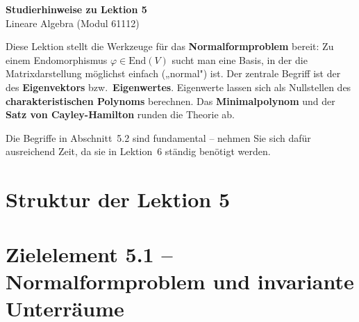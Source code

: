 \documentclass[a4paper,12pt]{article}
\begin{document}
\begin{center}
  {\LARGE\bfseries Studierhinweise zu Lektion 5}\\[0.5em]
  {\large Lineare Algebra (Modul 61112)}
\end{center}

\vspace{0.8em}

Diese Lektion stellt die Werkzeuge für das \textbf{Normalformproblem} bereit: Zu einem Endomorphismus
$\varphi \in \mathrm{End}(V)$ sucht man eine Basis, in der die Matrixdarstellung möglichst einfach
(„normal") ist. Der zentrale Begriff ist der des \textbf{Eigenvektors} bzw.\ \textbf{Eigenwertes}.
Eigenwerte lassen sich als Nullstellen des \textbf{charakteristischen Polynoms} berechnen.
Das \textbf{Minimalpolynom} und der \textbf{Satz von Cayley-Hamilton} runden die Theorie ab.

Die Begriffe in Abschnitt~5.2 sind fundamental -- nehmen Sie sich dafür ausreichend Zeit,
da sie in Lektion~6 ständig benötigt werden.

\section*{Struktur der Lektion 5}

\begin{center}
\end{center}

\newpage

\section*{Zielelement 5.1 -- Normalformproblem und invariante Unterräume}
\end{document}
